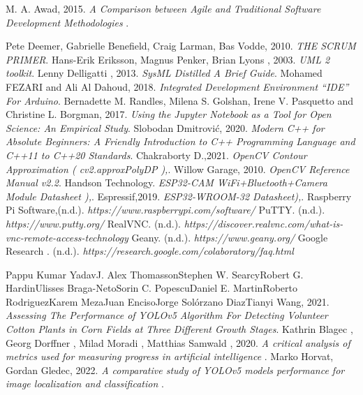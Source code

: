 \begin{thebibliography}{20}
M. A. Awad, 2015. \emph{A Comparison between Agile and Traditional Software Development Methodologies 
}.

Pete Deemer, Gabrielle Benefield, Craig Larman, Bas Vodde, 2010. \emph{THE
SCRUM PRIMER}.
Hans-Erik Eriksson, Magnus Penker, Brian Lyons
, 2003. \emph{UML 2 toolkit}.
Lenny Delligatti , 2013. \emph{SysML Distilled A Brief Guide}.
 Mohamed FEZARI and Ali Al Dahoud, 2018. \emph{Integrated Development Environment “IDE” For Arduino}.
Bernadette M. Randles, Milena S. Golshan, Irene V. Pasquetto and Christine L. Borgman, 2017. \emph{Using the Jupyter Notebook as a Tool for Open Science: An Empirical Study}.
Slobodan Dmitrović, 2020. \emph{ Modern C++ for Absolute Beginners: A Friendly Introduction to C++ Programming Language and C++11 to C++20 Standards}.
Chakraborty D.,2021. \emph{ OpenCV Contour Approximation ( cv2.approxPolyDP ),}.
Willow Garage, 2010. \emph{OpenCV Reference Manual v2.2}.
Handson Technology. \emph{ ESP32-CAM WiFi+Bluetooth+Camera Module Datasheet ),}.
Espressif,2019. \emph{ ESP32-WROOM-32 Datasheet),}.
Raspberry Pi Software,(n.d.). \emph{https://www.raspberrypi.com/software/}
PuTTY. (n.d.). \emph{ https://www.putty.org/}
RealVNC. (n.d.). \emph{ https://discover.realvnc.com/what-is-vnc-remote-access-technology}
Geany. (n.d.). \emph{https://www.geany.org/}
Google Research . (n.d.). \emph{https://research.google.com/colaboratory/faq.html}

Pappu Kumar YadavJ. Alex ThomassonStephen W. SearcyRobert G. HardinUlisses Braga-NetoSorin C. PopescuDaniel E. MartinRoberto RodriguezKarem MezaJuan EncisoJorge Solórzano DiazTianyi Wang, 2021. \emph{ Assessing The Performance of YOLOv5 Algorithm For Detecting Volunteer Cotton Plants in Corn Fields at Three Different Growth Stages}.
Kathrin Blagec  , Georg Dorffner  , Milad Moradi , Matthias Samwald , 2020. \emph{ A critical analysis of metrics used for measuring progress in artificial intelligence }.
Marko Horvat, Gordan Gledec, 2022. \emph{A comparative study of YOLOv5 models performance for image localization and classification  }.





\end{thebibliography}
